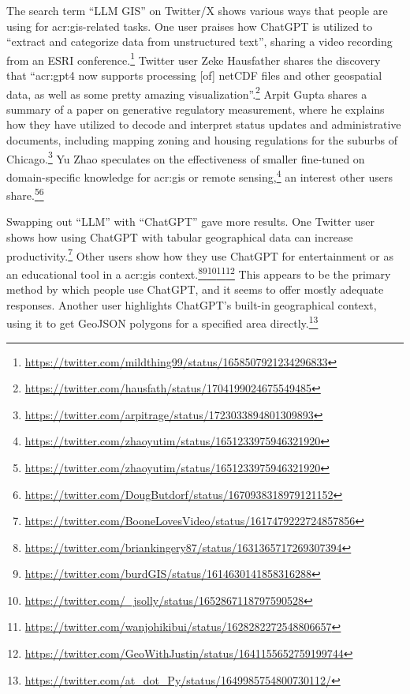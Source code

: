 The search term \enquote{LLM GIS} on Twitter/X shows various ways that people are using  for \acrshort{acr:gis}-related tasks. One user praises how ChatGPT is utilized to \enquote{extract and categorize data from unstructured text}, sharing a video recording from an ESRI conference.\footnote{\url{https://twitter.com/mildthing99/status/1658507921234296833}} Twitter user Zeke Hausfather shares the discovery that \enquote{\acrshort{acr:gpt}4 now supports processing [of] netCDF files and other geospatial data, as well as some pretty amazing visualization}.\footnote{\url{https://twitter.com/hausfath/status/1704199024675549485}} Arpit Gupta shares a summary of a paper on generative regulatory measurement, where he explains how they have utilized  to decode and interpret status updates and administrative documents, including mapping zoning and housing regulations for the suburbs of Chicago.\footnote{\url{https://twitter.com/arpitrage/status/1723033894801309893}} Yu Zhao speculates on the effectiveness of smaller  fine-tuned on domain-specific knowledge for \acrshort{acr:gis} or remote sensing,\footnote{\url{https://twitter.com/zhaoyutim/status/1651233975946321920}} an interest other users share.\footnote{\url{https://twitter.com/zhaoyutim/status/1651233975946321920}}\footnote{\url{https://twitter.com/DougButdorf/status/1670938318979121152}}

Swapping out \enquote{LLM} with \enquote{ChatGPT} gave more results. One Twitter user shows how using ChatGPT with tabular geographical data can increase productivity.\footnote{\url{https://twitter.com/BooneLovesVideo/status/1617479222724857856}} Other users show how they use ChatGPT for entertainment or as an educational tool in a \acrshort{acr:gis} context.\footnote{\url{https://twitter.com/briankingery87/status/1631365717269307394}}\footnote{\url{https://twitter.com/burdGIS/status/1614630141858316288}}\footnote{\url{https://twitter.com/_jsolly/status/1652867118797590528}}\footnote{\url{https://twitter.com/wanjohikibui/status/1628282272548806657}}\footnote{\url{https://twitter.com/GeoWithJustin/status/1641155652759199744}} This appears to be the primary method by which people use ChatGPT, and it seems to offer mostly adequate responses. Another user highlights ChatGPT's built-in geographical context, using it to get GeoJSON polygons for a specified area directly.\footnote{\url{https://twitter.com/at_dot_Py/status/1649985754800730112/}}

